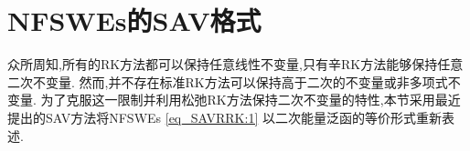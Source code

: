 
\section{NFSWEs的SAV格式}\label{Section_SAVRRK: 2}

众所周知,所有的RK方法都可以保持任意线性不变量,只有辛RK方法能够保持任意二次不变量.
然而,并不存在标准RK方法可以保持高于二次的不变量或非多项式不变量.
为了克服这一限制并利用松弛RK方法保持二次不变量的特性,本节采用最近提出的SAV方法将NFSWEs \eqref{eq_SAVRRK:1} 以二次能量泛函的等价形式重新表述.

